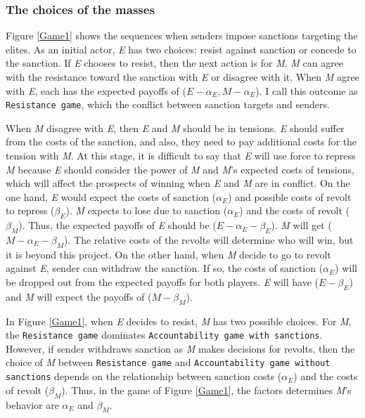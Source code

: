 \documentclass[11pt]{article}
\begin{document}
\begin{center}
	
\end{center}

\subsubsection*{The choices of the masses}

Figure \ref{Game1} shows the sequences when senders impose sanctions targeting the elites. As an initial actor, \textit{E} has two choices: resist against sanction or concede to the sanction. If \textit{E} chooses to resist, then the next action is for \textit{M}. \textit{M} can agree with the resistance toward the sanction with \textit{E} or disagree with it. When \textit{M} agree with \textit{E}, each has the expected payoffs of ($E - \alpha_E, M - \alpha_{E}$). I call this outcome as \texttt{Resistance game}, which the conflict between sanction targets and senders.
	
When \textit{M} disagree with \textit{E}, then \textit{E} and \textit{M} should be in tensions. \textit{E} should suffer from the costs of the sanction, and also, they need to pay additional costs for the tension with \textit{M}. At this stage, it is difficult to say that \textit{E} will use force to repress \textit{M} because \textit{E} should consider the power of \textit{M} and \textit{M}'s expected costs of tensions, which will affect the prospects of winning when \textit{E} and \textit{M} are in conflict. On the one hand, \textit{E} would expect the costs of sanction ($\alpha_{E}$) and possible costs of revolt to repress ($\beta_{E}$). \textit{M} expects to lose due to sanction ($\alpha_{E}$) and the costs of revolt ($\beta_{M}$). Thus, the expected payoffs of \textit{E} should be ($E - \alpha_{E}- \beta_{E}$). \textit{M} will get ($M-\alpha_{E}-\beta_{M}$). The relative costs of the revolts will determine who will win, but it is beyond this project. On the other hand, when \textit{M} decide to go to revolt against \textit{E}, sender can withdraw the sanction. If so, the costs of sanction ($\alpha_{E}$) will be dropped out from the expected payoffs for both players. \textit{E} will have ($E-\beta_{E}$) and \textit{M} will expect the payoffs of ($M-\beta_{M}$).

In Figure \ref{Game1}, when \textit{E} decides to resist, \textit{M} has two possible choices. For \textit{M}, the \texttt{Resistance game} dominates \texttt{Accountability game with sanctions}. However, if sender withdraws sanction as \textit{M} makes decisions for revolts, then the choice of \textit{M} between \texttt{Resistance game} and \texttt{Accountability game without sanctions} depends on the relationship between sanction costs ($\alpha_{E}$)  and the costs of revolt ($\beta_{M}$). Thus, in the game of Figure \ref{Game1}, the factors determines \textit{M}'s behavior are $\alpha_{E}$ and $\beta_{M}$.
\end{document}
